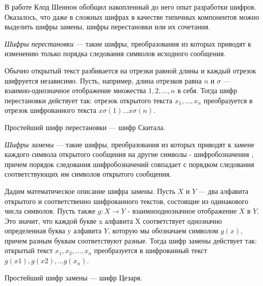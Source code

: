 В работе \cite{shannon-inf} Клод Шеннон обобщил накопленный до него опыт 
разработки шифров. Оказалось, что даже в сложных шифрах в качестве 
типичных компонентов можно выделить шифры замены, шифры перестановки 
или их сочетания.

\DEF\textit{Шифры перестановки} — такие шифры, преобразования из которых 
приводят к изменению только порядка следования символов исходного 
сообщения. 

Обычно открытый текст разбивается на отрезки равной длины 
и каждый отрезок шифруется независимо. Пусть, например, длина отрезков 
равна $n$ и $\sigma$ — взаимно-однозначное отображение множества 
${1, 2, \dots, n}$ в себя.
Тогда шифр перестановки действует так: отрезок открытого 
текста $x_1, \dots, x_n$ преобразуется в отрезок шифрованного текста 
$x \sigma(1)\dots x \sigma(n)$. 

Простейший шифр перестановки — шифр Скитала.

\DEF\textit{Шифры замены} — такие шифры, преобразования из которых приводят 
к замене каждого символа открытого сообщения на другие символы - шифробозначения
, причем порядок следования шифробозначений совпадает с порядком следования 
соответствующих им символов открытого сообщения. 

Дадим математическое описание шифра замены. 
Пусть $X$ и $Y$ — два алфавита открытого и соответственно 
шифрованного текстов, состоящие из одинакового числа символов. Пусть 
также $g: X \rightarrow Y$ - взаимнооднозначное отображение $X$ в $Y$. Это значит,
что каждой букве x алфавита X соответствует однозначно определенная 
буква y алфавита $Y$, которую мы обозначаем символом $g(x)$, причем 
разным буквам соответствуют разные. Тогда шифр замены действует так:
открытый текст $x_1, x_2, \dots, x_n$ преобразуется в шифрованный текст 
$g(x1), g(x2), \dots g(x_n)$. 

Простейший шифр замены — шифр Цезаря. 

